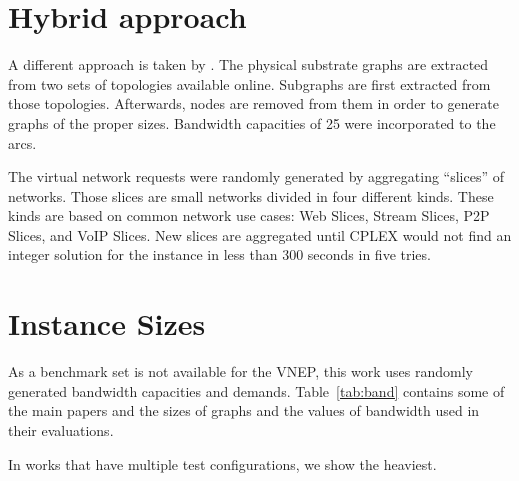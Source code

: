 \section{Hybrid approach}

A different approach is taken by \cite{infuhr:2011}. The physical substrate graphs are extracted from two sets of topologies available online. Subgraphs are first extracted from those topologies. Afterwards, nodes are removed from them in order to generate graphs of the proper sizes. Bandwidth capacities of 25 were incorporated to the arcs.

The virtual network requests were randomly generated by aggregating ``slices'' of networks. Those slices are small networks divided in four different kinds. These kinds are based on common network use cases: Web Slices, Stream Slices, P2P Slices, and  VoIP Slices. New slices are aggregated until CPLEX would not find an integer solution for the instance in less than 300 seconds in five tries.

\section{Instance Sizes}
As a benchmark set is not available for the VNEP, this work uses randomly generated bandwidth capacities and demands. Table~\ref{tab:band} contains some of the main papers and the sizes of graphs and the values of bandwidth used in their evaluations.

  In works that have multiple test configurations, we show the heaviest.

